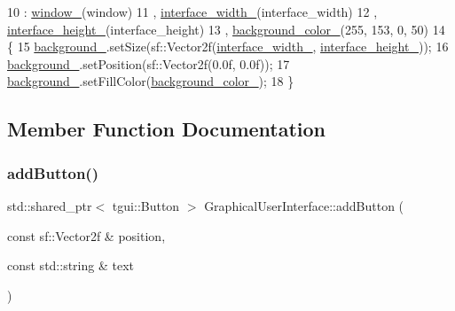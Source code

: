 \begin{DoxyCode}
10     : \hyperlink{classGraphicalUserInterface_ae51adeb759a97196eda3b37bfc80a452}{window\_}(window)
11     , \hyperlink{classGraphicalUserInterface_ae3c07ea59e557909f92882028fafb0a3}{interface\_width\_}(interface\_width)
12     , \hyperlink{classGraphicalUserInterface_a2e867c6d5b0d903d9e16e9934af93fc1}{interface\_height\_}(interface\_height)
13     , \hyperlink{classGraphicalUserInterface_a0361d82710bb150c272a2a760164241f}{background\_color\_}(255, 153, 0, 50)
14 \{
15     \hyperlink{classGraphicalUserInterface_a6d706ef82ec59d143a009331b40681bb}{background\_}.setSize(sf::Vector2f(\hyperlink{classGraphicalUserInterface_ae3c07ea59e557909f92882028fafb0a3}{interface\_width\_}, 
      \hyperlink{classGraphicalUserInterface_a2e867c6d5b0d903d9e16e9934af93fc1}{interface\_height\_}));
16     \hyperlink{classGraphicalUserInterface_a6d706ef82ec59d143a009331b40681bb}{background\_}.setPosition(sf::Vector2f(0.0f, 0.0f));
17     \hyperlink{classGraphicalUserInterface_a6d706ef82ec59d143a009331b40681bb}{background\_}.setFillColor(\hyperlink{classGraphicalUserInterface_a0361d82710bb150c272a2a760164241f}{background\_color\_});
18 \}
\end{DoxyCode}


\subsection{Member Function Documentation}
\mbox{\label{classGraphicalUserInterface_a91abd8446fe18cee7ff63a541a79da56}} 
\subsubsection{\texorpdfstring{add\+Button()}{addButton()}}
{\footnotesize\ttfamily std\+::shared\+\_\+ptr$<$ tgui\+::\+Button $>$ Graphical\+User\+Interface\+::add\+Button (\begin{DoxyParamCaption}\item[{const sf\+::\+Vector2f \&}]{position,  }\item[{const std\+::string \&}]{text }\end{DoxyParamCaption})\hspace{0.3cm}{\ttfamily [private]}}



